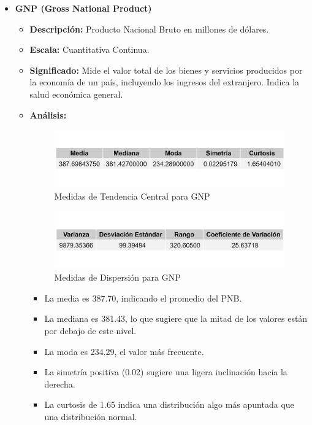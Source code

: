\documentclass{article}
\begin{document}
\begin{itemize}
    
    \item \textbf{GNP (Gross National Product)}
    \begin{itemize}
        \item \textbf{Descripción:} Producto Nacional Bruto en millones de dólares.
        \item \textbf{Escala:} Cuantitativa Continua.
        \item \textbf{Significado:} Mide el valor total de los bienes y servicios producidos por la economía de un país, incluyendo los ingresos del extranjero. Indica la salud económica general.
        \item \textbf{Análisis:} 
        \begin{figure}[H]
            \centering
            \includegraphics[width=\textwidth]{MTC/GNP_central.png}
            \caption{Medidas de Tendencia Central para GNP}
        \end{figure}
        \begin{figure}[H]
            \centering
            \includegraphics[width=\textwidth]{MTC/GNP_dispersion.png}
            \caption{Medidas de Dispersión para GNP}
        \end{figure}
            \begin{itemize}
                \item La media es 387.70, indicando el promedio del PNB.
                \item La mediana es 381.43, lo que sugiere que la mitad de los valores están por debajo de este nivel.
                \item La moda es 234.29, el valor más frecuente.
                \item La simetría positiva (0.02) sugiere una ligera inclinación hacia la derecha.
                \item La curtosis de 1.65 indica una distribución algo más apuntada que una distribución normal.

\end{itemize}
\end{itemize}
\end{itemize}
\end{document}
